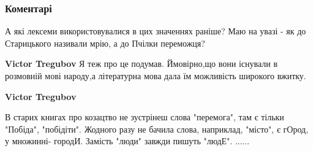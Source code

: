  
 
 
 
 
\subsubsection{Коментарі}

\begin{itemize}
 

А які лексеми використовувалися в цих значеннях раніше? Маю на увазі - як до
Старицького називали мрію, а до Пчілки переможця?

\begin{itemize}
 
\textbf{Victor Tregubov} Я теж про це подумав. Ймовірно,що вони існували в розмовній мові народу,а літературна мова дала їм можливість широкого вжитку.

 
\textbf{Victor Tregubov} 

В старих книгах про козацтво не зустрінеш слова "перемога", там є тільки
"Побіда", "побідіти". Жодного разу не бачила слова, наприклад, "місто", є
гОрод, у множинні- городИ. Замість "люди" завжди пишуть "людЕ". ......


 

\end{itemize}
\end{itemize}
